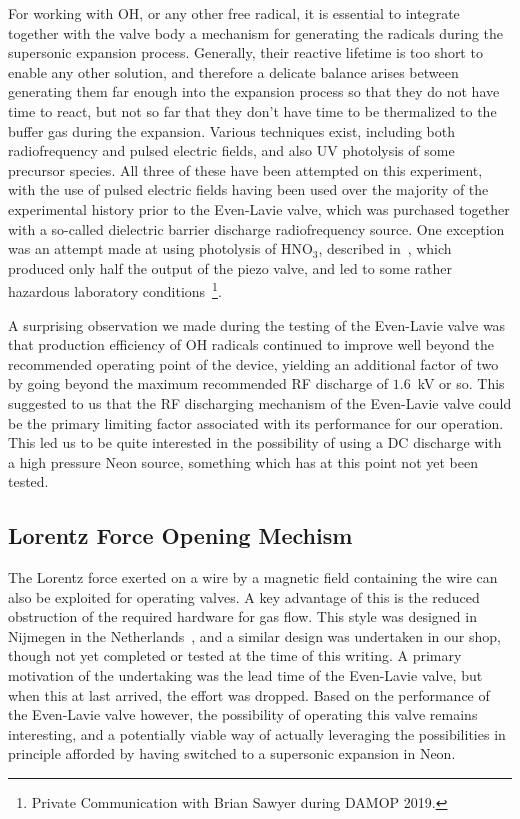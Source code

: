 For working with OH, or any other free radical, it is essential to integrate together with the valve body a mechanism for generating the radicals during the supersonic expansion process.
Generally, their reactive lifetime is too short to enable any other solution, and therefore a delicate balance arises between generating them far enough into the expansion process so that they do not have time to react, but not so far that they don't have time to be thermalized to the buffer gas during the expansion.
Various techniques exist, including both radiofrequency and pulsed electric fields, and also UV photolysis of some precursor species.
All three of these have been attempted on this experiment, with the use of pulsed electric fields having been used over the majority of the experimental history prior to the Even-Lavie valve, which was purchased together with a so-called dielectric barrier discharge radiofrequency source.
One exception was an attempt made at using photolysis of HNO$_3$, described in~\citep[Sec.~3.1.4.2]{SawyerThesis2010}, which produced only half the output of the piezo valve, and led to some rather hazardous laboratory conditions~\footnote{Private Communication with Brian Sawyer during DAMOP 2019.}\!.

A surprising observation we made during the testing of the Even-Lavie valve was that production efficiency of OH radicals continued to improve well beyond the recommended operating point of the device, yielding an additional factor of two by going beyond the maximum recommended RF discharge of $1.6$~kV or so.
This suggested to us that the RF discharging mechanism of the Even-Lavie valve could be the primary limiting factor associated with its performance for our operation.
This led us to be quite interested in the possibility of using a DC discharge with a high pressure Neon source, something which has at this point not yet been tested.

\subsection{Lorentz Force Opening Mechism}

The Lorentz force exerted on a wire by a magnetic field containing the wire can also be exploited for operating valves.
A key advantage of this is the reduced obstruction of the required hardware for gas flow.
This style was designed in Nijmegen in the Netherlands~\cite{Yan2013}, and a similar design was undertaken in our shop, though not yet completed or tested at the time of this writing.
A primary motivation of the undertaking was the lead time of the Even-Lavie valve, but when this at last arrived, the effort was dropped.
Based on the performance of the Even-Lavie valve however, the possibility of operating this valve remains interesting, and a potentially viable way of actually leveraging the possibilities in principle afforded by having switched to a supersonic expansion in Neon.

